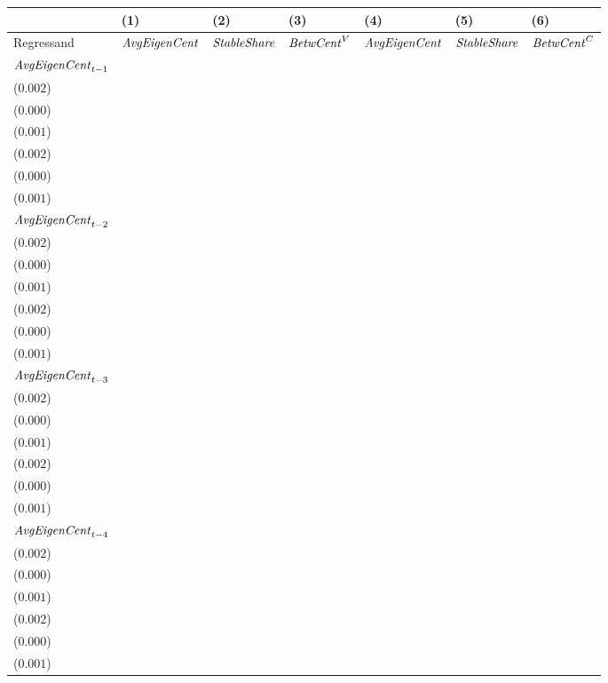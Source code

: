 \begin{tabular}{lllllll}
\toprule
{} &                                     (1) &                                     (2) &                                     (3) &                                     (4) &                                     (5) &                                     (6) \\
\midrule
Regressand                 &                    ${\it AvgEigenCent}$ &                     ${\it StableShare}$ &                      ${\it BetwCent}^V$ &                    ${\it AvgEigenCent}$ &                     ${\it StableShare}$ &                      ${\it BetwCent}^C$ \\
${\it AvgEigenCent}_{t-1}$ &   \makecell{$0.555^{***}$ \\ ($0.002$)} &     \makecell{$-0.000^{}$ \\ ($0.000$)} &     \makecell{$-0.001^{}$ \\ ($0.001$)} &   \makecell{$0.555^{***}$ \\ ($0.002$)} &     \makecell{$-0.000^{}$ \\ ($0.000$)} &     \makecell{$-0.000^{}$ \\ ($0.001$)} \\
${\it AvgEigenCent}_{t-2}$ &   \makecell{$0.177^{***}$ \\ ($0.002$)} &   \makecell{$0.000^{***}$ \\ ($0.000$)} &     \makecell{$0.002^{*}$ \\ ($0.001$)} &   \makecell{$0.177^{***}$ \\ ($0.002$)} &   \makecell{$0.000^{***}$ \\ ($0.000$)} &      \makecell{$0.001^{}$ \\ ($0.001$)} \\
${\it AvgEigenCent}_{t-3}$ &   \makecell{$0.058^{***}$ \\ ($0.002$)} &  \makecell{$-0.000^{***}$ \\ ($0.000$)} &    \makecell{$0.002^{**}$ \\ ($0.001$)} &   \makecell{$0.058^{***}$ \\ ($0.002$)} &  \makecell{$-0.000^{***}$ \\ ($0.000$)} &     \makecell{$-0.000^{}$ \\ ($0.001$)} \\
${\it AvgEigenCent}_{t-4}$ &   \makecell{$0.018^{***}$ \\ ($0.002$)} &   \makecell{$0.000^{***}$ \\ ($0.000$)} &  \makecell{$-0.003^{***}$ \\ ($0.001$)} &   \makecell{$0.019^{***}$ \\ ($0.002$)} &   \makecell{$0.000^{***}$ \\ ($0.000$)} &    \makecell{$-0.001^{*}$ \\ ($0.001$)} \\

\end{tabular}
